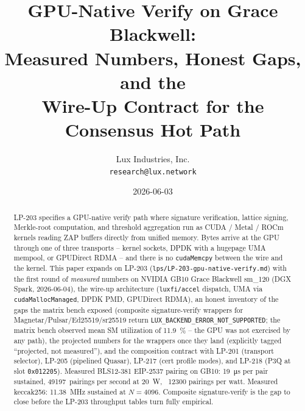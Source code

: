 \documentclass[11pt,a4paper]{article}
\title{GPU-Native Verify on Grace Blackwell:\\
       Measured Numbers, Honest Gaps, and the\\
       Wire-Up Contract for the Consensus Hot Path}
\author{Lux Industries, Inc. \\
        \texttt{research@lux.network}}
\date{2026-06-03}
\begin{document}
\luxcoverpage

\begin{abstract}
LP-203 specifies a GPU-native verify path where signature
verification, lattice signing, Merkle-root computation, and
threshold aggregation run as CUDA / Metal / ROCm kernels reading
ZAP buffers directly from unified memory. Bytes arrive at the GPU
through one of three transports -- kernel sockets, DPDK with a
hugepage UMA mempool, or GPUDirect RDMA -- and there is no
\texttt{cudaMemcpy} between the wire and the kernel. This paper
expands on LP-203 (\texttt{lps/LP-203-gpu-native-verify.md}) with
the first round of \emph{measured} numbers on NVIDIA GB10 Grace
Blackwell sm\_120 (DGX Spark, 2026-06-04), the wire-up architecture
(\texttt{luxfi/accel} dispatch, UMA via \texttt{cudaMallocManaged},
DPDK PMD, GPUDirect RDMA), an honest inventory of the gaps the
matrix bench exposed (composite signature-verify wrappers for
Magnetar/Pulsar/Ed25519/sr25519 return
\texttt{LUX\_BACKEND\_ERROR\_NOT\_SUPPORTED}; the matrix bench observed mean
SM utilization of \SI{11.9}{\percent} -- the GPU was not exercised
by any path), the projected numbers for the wrappers once they
land (explicitly tagged ``projected, not measured''), and the
composition contract with LP-201 (transport selector), LP-205
(pipelined Quasar), LP-217 (cert profile modes), and LP-218 (P3Q
at slot \texttt{0x012205}). Measured BLS12-381 EIP-2537 pairing on
GB10: \SI{19}{\micro\second} per pair sustained,
\num{49197}~pairings per second at \SI{20}{\watt}, ~\num{12300}
pairings per watt. Measured keccak256: \SI{11.38}{\mega\hertz}
sustained at $N{=}4096$. Composite signature-verify is the gap to
close before the LP-203 throughput tables turn fully empirical.
\end{abstract}

\tableofcontents
\newpage











\end{document}
